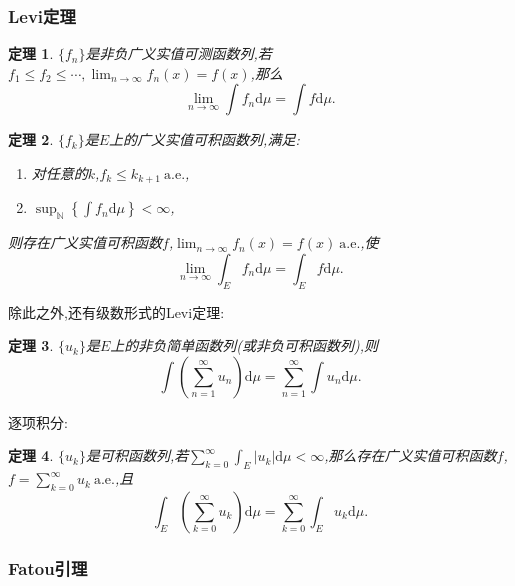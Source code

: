 \documentclass[12pt,a4paper,oneside]{ctexart}
\theoremstyle{nonumberplain}
\theoremstyle{plain}
\newtheorem{theorem}{定理}[section]
\theoremstyle{plain}
\theoremstyle{nonumberplain}
\theoremstyle{plain}
\theoremstyle{plain}
\theoremstyle{plain}
\theoremstyle{plain}
\newcommand{\dif}{\mathrm{d}}
\newcommand{\N}{\mathbb{N}}
\renewcommand{\ae}{\mbox{a.e.}}
\begin{document}
    \subsubsection{Levi定理}

    \begin{theorem}
        $\{f_n\}$是非负广义实值可测函数列,若$f_1\leqslant f_2\leqslant\cdots,\lim_{n\to\infty}f_n(x)=f(x)$,那么  
        \begin{equation*}
            \lim_{n\to\infty}\int f_n\dif\mu=\int f\dif\mu.
        \end{equation*}
    \end{theorem}
    \begin{theorem}
        $\{f_k\}$是$E$上的广义实值可积函数列,满足:
        \begin{enumerate}
            \item 对任意的$k$,$f_k\leqslant k_{k+1}\ \ae$,
            \item $\sup_\N\left\{\int f_n\dif\mu\right\}<\infty$,
        \end{enumerate}
        则存在广义实值可积函数$f$,$\lim_{n\to\infty}f_n(x)=f(x)\ \ae$,使 
        \begin{equation*}
            \lim_{n\to\infty}\int_E f_n\dif \mu=\int_E f\dif\mu.
        \end{equation*}
    \end{theorem}
    除此之外,还有级数形式的Levi定理:
    \begin{theorem}
        $\{u_k\}$是$E$上的非负简单函数列(或非负可积函数列),则
        \begin{equation*}
            \int\left(\sum_{n=1}^\infty u_n\right)\dif\mu=\sum_{n=1}^\infty \int u_n\dif\mu.
        \end{equation*}
    \end{theorem}

    逐项积分:
    
    \begin{theorem}
        $\{u_k\}$是可积函数列,若$\sum_{k=0}^\infty\int_E |u_k|\dif\mu<\infty$,那么存在广义实值可积函数$f$,$f=\sum_{k=0}^\infty u_k\ \ae$,且
        \begin{equation*}
            \int_E\left(\sum_{k=0}^\infty u_k\right)\dif\mu=\sum_{k=0}^\infty\int_E u_k\dif\mu.
        \end{equation*}
    \end{theorem}

    \subsubsection{Fatou引理}
    
\end{document}

